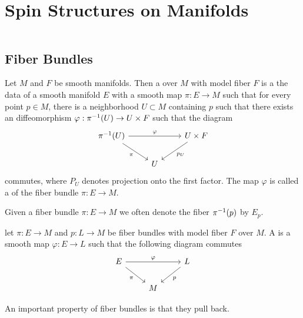 \chapter{Spin Structures on Manifolds}
%
\subsectionend $ $\\
%
\iffalse
\emph{Not all the geometrical structures are``equal". It would seem that the
Riemannian and complex structures, with their contacts with other fields of
mathematics and with their richness in results, should occupy a central position
in differential geometry. A unifying idea is the notion of a $G$-structure, which
is the modern version of an equivalence problem first emphasized and exploited
in its various special cases by \'Elie Cartan.} \\
%
\ib{-- ~ Shiing-Shen Chern}
%
\subsectionend
\fi
%
\section{Fiber Bundles}
%
\begin{defn}
Let $M$ and $F$ be smooth manifolds. Then a  over $M$ with
model fiber $F$ is a the data of a smooth manifold $E$ with a smooth map
$\pi : E \to M$ such that for every point $p \in M$, there is a neighborhood
$U \subset M$ containing $p$ such that there exists an diffeomorphism
$\varphi : \pi^{-1}(U) \to U \times F$ such that the diagram
\[\begin{tikzcd}
\pi\inv(U) \ar[rr, "\varphi"] \ar[dr, "\pi"']&& U \times F \ar[dl, "p_U"] \\
& U
\end{tikzcd}\]
commutes, where $P_U$ denotes projection onto the first factor. The map $\varphi$ is
called a  of the fiber bundle $\pi : E \to M$.
\end{defn}
%
Given a fiber bundle $\pi : E \to M$ we often denote the fiber $\pi^{-1}(p)$
by $E_p$.
%
\begin{defn}
let $\pi : E \to M$ and $p : L \to M$ be fiber bundles with model fiber $F$
over $M$. A  is a smooth map $\varphi : E \to L$ such
that the following diagram commutes
\[\begin{tikzcd}
E \ar[dr, "\pi"']\ar[rr,"\varphi"] & & L \ar[dl, "p"] \\
& M
\end{tikzcd}\]
\end{defn}
%
An important property of fiber bundles is that they pull back.
